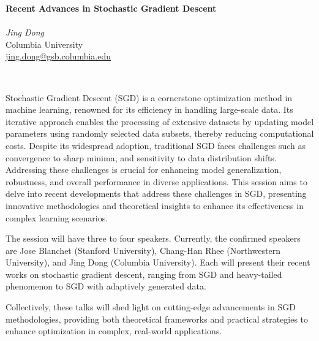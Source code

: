 \documentclass[12pt,a4paper,figuresright]{book}
\newcommand{\organizer}[3]{%
	{\textit{#1}}\\\nopagebreak%
	#2\\\nopagebreak%
	\url{#3}\vspace{3mm}\\\nopagebreak%
	}
\newenvironment{session}[5] %
 {%
  \vskip 0pt\nopagebreak%
  \textbf{#1}\vspace{3mm}\\\nopagebreak%
  \ifthenelse{\equal{#2}{1}}{Organizer:}{Organizers:}%
  \vspace{2mm}\\\nopagebreak%
  #3
  \ifthenelse{\equal{#2}{2}}{#4}{}%
  \ifthenelse{\equal{#2}{3}}{#4#5}{}%
  \quad\\\nopagebreak%
 }
 {\nopagebreak}%
\begin{document}
\begin{session}
  {Recent Advances in Stochastic Gradient Descent}%
  {1} %
  {\organizer{Jing Dong}%
    {Columbia University}%
    {jing.dong@gsb.columbia.edu}}%
  {\organizer{}%
	{}%
	{}}%
  {\organizer{}%
	{}%
	{}}%
  

Stochastic Gradient Descent (SGD) is a cornerstone optimization method in machine learning,
renowned for its efficiency in handling large-scale data. Its iterative approach enables
the processing of extensive datasets by updating model parameters using randomly selected
data subsets, thereby reducing computational costs. Despite its widespread adoption, traditional
SGD faces challenges such as convergence to sharp minima, and sensitivity to data
distribution shifts. Addressing these challenges is crucial for enhancing model generalization,
robustness, and overall performance in diverse applications. This session aims to delve into
recent developments that address these challenges in SGD, presenting innovative methodologies
and theoretical insights to enhance its effectiveness in complex learning scenarios.

The session will have three to four speakers. Currently, the confirmed speakers are Jose
Blanchet (Stanford University), Chang-Han Rhee (Northwestern University), and Jing Dong
(Columbia University). Each will present their recent works on stochastic gradient descent,
ranging from SGD and heavy-tailed phenomenon to SGD with adaptively generated data.

Collectively, these talks will shed light on cutting-edge advancements in SGD methodologies,
providing both theoretical frameworks and practical strategies to enhance optimization in
complex, real-world applications.

\end{session}
\end{document}
